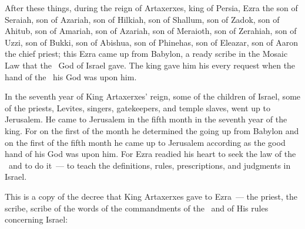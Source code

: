 
\begin{inparaenum}
   After these things, during the reign of Artaxerxes, king of Persia, Ezra the son of Seraiah, son of Azariah, son of Hilkiah,%
   son of Shallum, son of Zadok, son of Ahitub,%
   son of Amariah, son of Azariah, son of Meraioth,%
   son of Zerahiah, son of Uzzi, son of Bukki,%
   son of Abishua, son of Phinehas, son of Eleazar, son of Aaron the chief priest;%
   this Ezra came up from Babylon, a ready scribe in the Mosaic Law that the \lord\ God of Israel gave. The king gave him his every request when the hand of the \lord\ his God was upon him.%

   In the seventh year of King Artaxerxes' reign, some of the children of Israel, some of the priests, Levites, singers, gatekeepers, and temple slaves, went up to Jerusalem.%
   He came to Jerusalem in the fifth month in the seventh year of the king.%
   For on the first of the month he determined the going up from Babylon and on the first of the fifth month he came up to Jerusalem according as the good hand of his God was upon him.%
   For Ezra readied his heart to seek the law of the \lord\ and to do it~--- to teach the definitions, rules, prescriptions, and judgments in Israel.%

   This is a copy of the decree that King Artaxerxes gave to Ezra~--- the priest, the scribe, scribe of the words of the commandments of the \lord\ and of His rules concerning Israel:%
\end{inparaenum}
